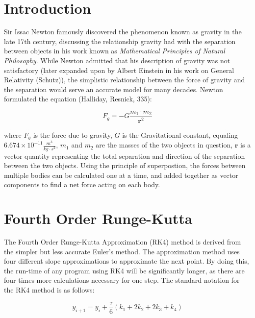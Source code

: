 \documentclass{article}
\renewcommand{\vec}[1]{\mathbf{#1}}
\begin{document}
\begin{multicols}{2}
\section{Introduction}
Sir Issac Newton famously discovered the phenomenon known as gravity in the late 17th century, discussing the relationship gravity had with the separation between objects in his work known as \textit{Mathematical Principles of Natural Philosophy}. While Newton admitted that his description of gravity was not satisfactory (later expanded upon by Albert Einstein in his work on General Relativity (Schutz)), the simplistic relationship between the force of gravity and the separation would serve an accurate model for many decades. Newton formulated the equation (Halliday, Resnick, 335):

\begin{equation}
    \label{equation1}
    F_g = -G\frac{m_1 \cdot m_2}{\vec{r}^2}
\end{equation}

\vspace{0.1in}

where $F_g$ is the force due to gravity, $G$ is the Gravitational constant, equaling $6.674 \times 10^{-11} \frac{m^3}{kg \cdot s^2}$, $m_1$ and $m_2$ are the masses of the two objects in question, $\vec{r}$ is a vector quantity representing the total separation and direction of the separation between the two objects. Using the principle of superpostion, the forces between multiple bodies can be calculated one at a time, and added together as vector components to find a net force acting on each body.

\section{Fourth Order Runge-Kutta}
The Fourth Order Runge-Kutta Approximation (RK4) method is derived from the simpler but less accurate Euler's method. The approximation method uses four different slope approximations to approximate the next point. By doing this, the run-time of any program using RK4 will be significantly longer, as there are four times more calculations necessary for one step. The standard notation for the RK4 method is as follows:

\begin{equation}
    \label{equation2}
    y_{i+1} = y_i+\frac{\tau}{6}\left(k_1+2k_2+2k_3+k_4\right)
\end{equation}


\end{multicols}
\end{document}
